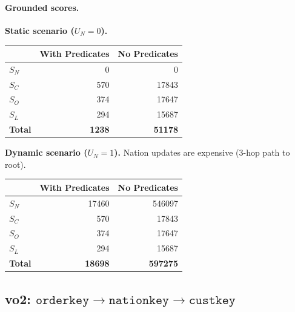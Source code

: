 \paragraph{Grounded scores.}

\smallskip
\noindent\textbf{Static scenario ($U_N = 0$).}
\begin{center}
\begin{tabular}{lrr}
\toprule
& With Predicates & No Predicates \\
\midrule
$S_N$ & 0 & 0 \\
$S_C$ & 570 & 17843 \\
$S_O$ & 374 & 17647 \\
$S_L$ & 294 & 15687 \\
\midrule
\textbf{Total} & \textbf{1238} & \textbf{51178} \\
\bottomrule
\end{tabular}
\end{center}

\smallskip
\noindent\textbf{Dynamic scenario ($U_N = 1$).}
Nation updates are expensive (3-hop path to root).
\begin{center}
\begin{tabular}{lrr}
\toprule
& With Predicates & No Predicates \\
\midrule
$S_N$ & 17460 & 546097 \\
$S_C$ & 570 & 17843 \\
$S_O$ & 374 & 17647 \\
$S_L$ & 294 & 15687 \\
\midrule
\textbf{Total} & \textbf{18698} & \textbf{597275} \\
\bottomrule
\end{tabular}
\end{center}

\subsection{vo2: $\texttt{orderkey} \rightarrow \texttt{nationkey} \rightarrow \texttt{custkey}$}

